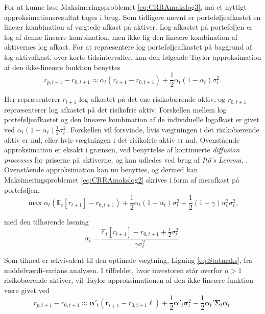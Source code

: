 \documentclass[
  a4paper,
  oneside]{memoir}
\begin{document}
For at kunne løse Maksimeringsproblemet \eqref{eq:CRRAmakslog3}, må et nyttigt approksimationsresultat tages i brug. Som tidligere nævnt er porteføljeafkastet en lineær kombination af vægtede afkast på aktiver. Log afkastet på porteføljen er log af denne lineære kombination, men ikke lig den lineære kombination af aktivernes log afkast. For at repræsentere log porteføljeafkastet på baggrund af log aktivafkast, over korte tidsintervaller, kan den følgende Taylor approksimation af den ikke-lineære funktion benyttes
\[r_{p,t+1}-r_{0,t+1}\approx \alpha_t (r_{t+1}-r_{0,t+1})+\frac{1}{2}\alpha_t(1-\alpha_t)\sigma_t^2.\]

Her repræsenterer \(r_{t+1}\) log afkastet på det ene risikobærende aktiv, og \(r_{0,t+1}\) repræsenterer log afkastet på det risikofrie aktiv. Forskellen mellem log porteføljeafkastet og den lineære kombination af de individuelle logafkast er givet ved \(\alpha_t(1-\alpha_t)\tfrac{1}{2}\sigma_t^2\). Forskellen vil forsvinde, hvis vægtningen i det risikobærende aktiv er nul, eller hvis vægtningen i det risikofrie aktiv er nul. Ovenstående approksimation er eksakt i grænsen, ved benyttelse af kontinuerte \emph{diffusion processes} for priserne på aktiverne, og kan udledes ved brug af \emph{Itô's Lemma}, \citep{CampVicCha2003}. Ovenstående approksimation kan nu benyttes, og dermed kan Maksimeringsproblemet \eqref{eq:CRRAmakslog2} skrives i form af merafkast på porteføljen.
\begin{equation}
\max\alpha_t(\mathbb{E}_t[r_{t+1}] - r_{0,t+1}) + \frac{1}{2}\alpha_t(1-\alpha_t)\sigma_t^2 + \frac{1}{2}(1-\gamma)\alpha_t^2\sigma_t^2, \label{eq:CRRAmakslog4} 
\end{equation}

med den tilhørende løsning
\begin{equation}
\alpha_t=\frac{\mathbb{E}_t[r_{t+1}] - r_{0,t+1}+\frac{1}{2}\sigma_t^2}{\gamma\sigma_t^2}.
\end{equation}

Som tilmed er ækvivalent til den optimale vægtning, Ligning \eqref{eq:Statmaks}, fra middelværdi-varians analysen. I tilfældet, hvor investoren står overfor \(n>1\) risikobærende aktiver, vil Taylor approksimationen af den ikke-lineære funktion være givet ved
\begin{equation}
r_{p,t+1}-r_{0,t+1}\approx \bm{\alpha}'_t (\bm{r}_{t+1}-r_{0,t+1}\bm{\ell})+\frac{1}{2}\bm{\alpha}'_t\bm{\sigma}_t^2 - \frac{1}{2} \bm{\alpha}_t'\bm{\Sigma}_t\bm{\alpha}_t. \label{eq:Multtaylor}
\end{equation}
\end{document}
